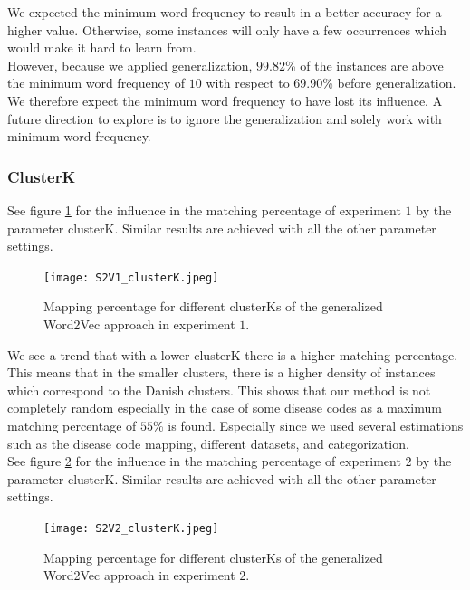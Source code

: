 We expected the minimum word frequency to result in a better accuracy for a higher value. Otherwise, some instances will only have a few occurrences which would make it hard to learn from. \\
However, because we applied generalization, $99.82$\% of the instances are above the minimum word frequency of $10$ with respect to $69.90$\% before generalization. We therefore expect the minimum word frequency to have lost its influence. A future direction to explore is to ignore the generalization and solely work with minimum word frequency.

\subsubsection{ClusterK}

See figure \ref{fig:s2v_clusterK_1} for the influence in the matching percentage of experiment $1$ by the parameter clusterK. Similar results are achieved with all the other parameter settings. \\

\begin{figure}[!htb]
	\centering
	\texttt{[image: S2V1\_clusterK.jpeg]}
	\caption{Mapping percentage for different clusterKs of the generalized Word2Vec approach in experiment $1$.}
	\label{fig:s2v_clusterK_1}
\end{figure}

\noindent We see a trend that with a lower clusterK there is a higher matching percentage. This means that in the smaller clusters, there is a higher density of instances which correspond to the Danish clusters. This shows that our method is not completely random especially in the case of some disease codes as a maximum matching percentage of $55$\% is found. Especially since we used several estimations such as the disease code mapping, different datasets, and categorization. \\

\noindent See figure \ref{fig:s2v_clusterK_2} for the influence in the matching percentage of experiment $2$ by the parameter clusterK. Similar results are achieved with all the other parameter settings. \\

\begin{figure}[!htb]
	\centering
	\texttt{[image: S2V2\_clusterK.jpeg]}
	\caption{Mapping percentage for different clusterKs of the generalized Word2Vec approach in experiment $2$.}
	\label{fig:s2v_clusterK_2}
\end{figure}

